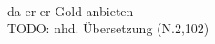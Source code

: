 \begin{exe}
\ex \label{ex:N31557} \gll {}      \\
{da} {er} {er} {Gold} {anbieten} {}\\
\glt TODO: nhd. Übersetzung (N.2,102)
\end{exe}
